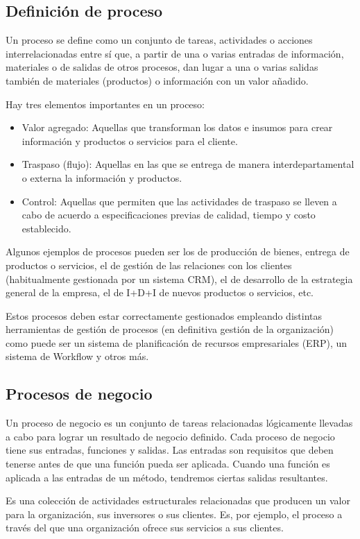 \subsection*{Definición de proceso}

Un proceso se define como un conjunto de tareas, actividades o acciones interrelacionadas entre sí que,
a partir de una o varias entradas de información, materiales o de salidas de otros procesos, dan lugar
a una o varias salidas también de materiales (productos) o información con un valor añadido.

Hay tres elementos importantes en un proceso:
\begin{itemize}
	\item Valor agregado: Aquellas que transforman los datos e insumos para crear información y productos o servicios para el cliente.
	\item Traspaso (flujo): Aquellas en las que se entrega de manera interdepartamental o externa la información y productos.
	\item Control: Aquellas que permiten que las actividades de traspaso se lleven a cabo de acuerdo a especificaciones previas de calidad, tiempo y costo establecido.
\end{itemize}
Algunos ejemplos de procesos pueden ser los de producción de bienes, entrega de productos o servicios,
el de gestión de las relaciones con los clientes (habitualmente gestionada por un sistema CRM), el de
desarrollo de la estrategia general de la empresa, el de I+D+I de nuevos productos o servicios, etc.

Estos procesos deben estar correctamente gestionados empleando distintas herramientas de gestión de
procesos (en definitiva gestión de la organización) como puede ser un sistema de planificación de
recursos empresariales (ERP), un sistema de Workflow y otros más.

\subsection*{Procesos de negocio}

Un proceso de negocio es un conjunto de tareas relacionadas lógicamente llevadas a cabo para lograr un
resultado de negocio definido. Cada proceso de negocio tiene sus entradas, funciones y salidas. Las
entradas son requisitos que deben tenerse antes de que una función pueda ser aplicada. Cuando una función
es aplicada a las entradas de un método, tendremos ciertas salidas resultantes.

Es una colección de actividades estructurales relacionadas que producen un valor para la organización,
sus inversores o sus clientes. Es, por ejemplo, el proceso a través del que una organización ofrece sus
servicios a sus clientes.

